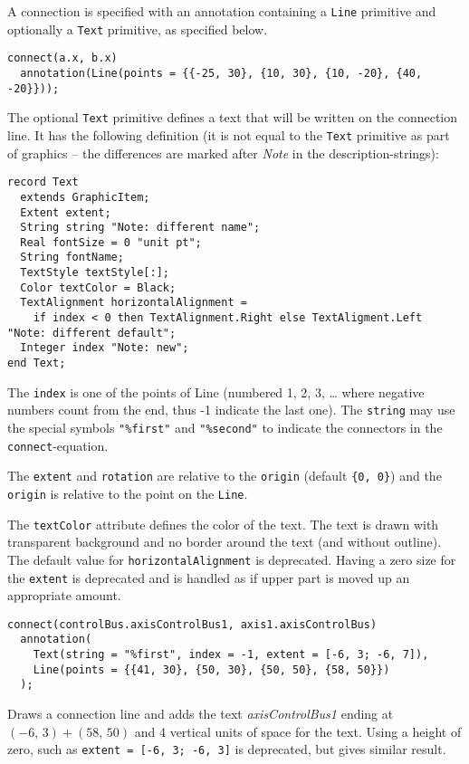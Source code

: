 A connection is specified with an annotation containing a \lstinline!Line! primitive and optionally a \lstinline!Text! primitive, as specified below.

\begin{example}
\begin{lstlisting}[language=modelica]
connect(a.x, b.x)
  annotation(Line(points = {{-25, 30}, {10, 30}, {10, -20}, {40, -20}}));
\end{lstlisting}
\end{example}

The optional \lstinline!Text! primitive defines a text that will be written on the connection line.
It has the following definition (it is not equal to the \lstinline!Text! primitive as part of graphics -- the differences are marked after \emph{Note} in the description-strings):
\begin{lstlisting}[language=modelica]
record Text
  extends GraphicItem;
  Extent extent;
  String string "Note: different name";
  Real fontSize = 0 "unit pt";
  String fontName;
  TextStyle textStyle[:];
  Color textColor = Black;
  TextAlignment horizontalAlignment =
    if index < 0 then TextAlignment.Right else TextAligment.Left "Note: different default";
  Integer index "Note: new";
end Text;
\end{lstlisting}

The \lstinline!index! is one of the points of Line (numbered 1, 2, 3, \ldots{} where negative numbers count from the end, thus -1 indicate the last one).
The \lstinline!string! may use the special symbols \lstinline!"%first"! and \lstinline!"%second"! to indicate the connectors in the \lstinline!connect!-equation.

The \lstinline!extent! and \lstinline!rotation! are relative to the \lstinline!origin! (default \lstinline!{0, 0}!) and the \lstinline!origin! is relative to the point on the \lstinline!Line!.

The \lstinline!textColor! attribute defines the color of the text.
The text is drawn with transparent background and no border around the text (and without outline).
The default value for \lstinline!horizontalAlignment! is deprecated.
Having a zero size for the \lstinline!extent! is deprecated and is handled as if upper part is moved up an appropriate amount.

\begin{example}
\begin{lstlisting}[language=modelica]
connect(controlBus.axisControlBus1, axis1.axisControlBus)
  annotation(
    Text(string = "%first", index = -1, extent = [-6, 3; -6, 7]),
    Line(points = {{41, 30}, {50, 30}, {50, 50}, {58, 50}})
  );
\end{lstlisting}
Draws a connection line and adds the text \emph{axisControlBus1} ending at $(-6,\, 3) + (58,\, 50)$ and 4 vertical units of space for the text.
Using a height of zero, such as \lstinline!extent = [-6, 3; -6, 3]! is deprecated, but gives similar result.
\end{example}

